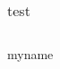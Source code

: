 \documentclass{article}
\def\datalist{
  16.03.2022/2,
  28.06.2022/3,    
  15.07.2022/4
}
\begin{document}
        
\begin{table}[h]
  \centering 
  \caption{test}
  \begin{tabular}{|p{100pt}|p{80pt}|p{55pt}|} 
    \hline
    \datatotable{\datalist}\\
    \hline
  \end{tabular}
\end{table}

myname
\end{document}
